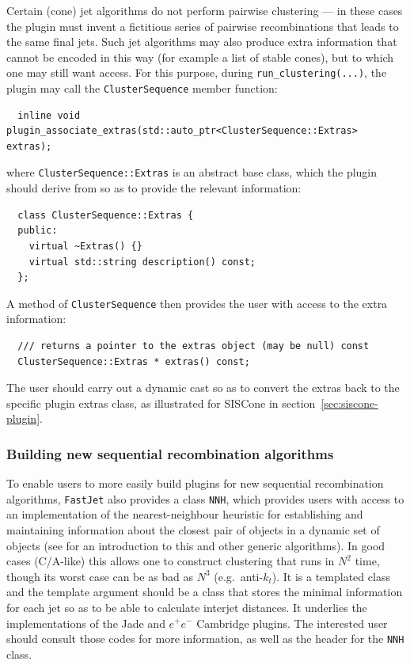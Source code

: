 \documentclass[12pt,a4]{article}
\newcommand{\fastjet}{\texttt{FastJet}\xspace}
\newcommand{\ee}{e^+e^-}
\begin{document}
Certain (cone) jet algorithms do not perform pairwise clustering ---
in these cases the plugin must invent a fictitious series of pairwise
recombinations that leads to the same final jets. Such jet algorithms
may also produce extra information that cannot be encoded in this way
(for example a list of stable cones), but to which one may still want
access. For this purpose, during \verb|run_clustering(...)|, the
plugin may call the \verb|ClusterSequence| member function:
\begin{lstlisting}
  inline void plugin_associate_extras(std::auto_ptr<ClusterSequence::Extras> extras);
\end{lstlisting}
where \verb|ClusterSequence::Extras| is an abstract base class, which
the plugin should derive from so as to provide the relevant information:
\begin{lstlisting}
  class ClusterSequence::Extras {
  public:
    virtual ~Extras() {}
    virtual std::string description() const;
  };
\end{lstlisting}
A method of \verb|ClusterSequence| then provides the user with access
to the extra information:
\begin{lstlisting}
  /// returns a pointer to the extras object (may be null) const
  ClusterSequence::Extras * extras() const;
\end{lstlisting}
The user should carry out a dynamic cast so as to convert the extras
back to the specific plugin extras class, as illustrated for
SISCone in section~\ref{sec:siscone-plugin}.


\subsubsection{Building new sequential recombination algorithms}
\label{sec:new-seq-rec}

To enable users to more easily build plugins for new sequential
recombination algorithms, \fastjet also provides a class \verb|NNH|,
which provides users with access to an implementation of the
nearest-neighbour heuristic for establishing and maintaining
information about the closest pair of objects in a dynamic set of
objects (see \cite{EppsteinHierarchical} for an introduction to this
and other generic algorithms).
%
In good cases (C/A-like) this allows one to construct clustering that runs in
$N^2$ time, though its worst case can be as bad as $N^3$ (e.g.\ anti-$k_t$).
%
It is a templated class and the template argument should be a class
that stores the minimal information for each jet so as to be able to
calculate interjet distances.
%
It underlies the implementations of the Jade and $\ee$ Cambridge
plugins.
%
The interested user should consult those codes for more information,
as well as the header for the \verb|NNH| class.
\end{document}
